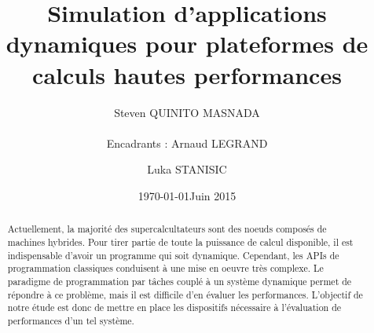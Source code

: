 \documentclass[smallextended]{svjour3}
\date{\today}
\title{}
\begin{document}
\newcommand{\AL}[2][inline]{\todo[color=green!50,#1]{\sf \textbf{AL:} #2}\xspace}
\newcommand{\LS}[2][inline]{\todo[color=green!50,#1]{\sf \textbf{LS:} #2}\xspace}

\let\oldcite=\cite
\renewcommand\cite[2][]{~\ifthenelse{\equal{#1}{}}{\oldcite{#2}}{\oldcite[#1]{#2}}\xspace}
\let\oldref=\ref
\def\ref#1{~\oldref{#1}\xspace}
\def\ie{i.e.,\xspace}
\def\eg{e.g.,\xspace}
\def\qrmspu{\texttt{QRM\_StarPU}\xspace}
\sloppy

\title{Simulation d'applications dynamiques pour plateformes de
calculs hautes performances%
}


\author{Steven QUINITO MASNADA  \\ \\
        Encadrants : Arnaud LEGRAND \and Luka STANISIC  %
}


\institute{%
}

\date{Juin 2015}

\maketitle


\begin{abstract}
Actuellement, la majorité des supercalcultateurs sont des noeuds
composés de machines hybrides. Pour tirer partie de toute la
puissance de calcul disponible, il est indispensable d'avoir un
programme qui soit dynamique. Cependant, les APIs de programmation
classiques conduisent à une mise en oeuvre très complexe.
Le paradigme de programmation par tâches couplé à un système
dynamique permet de répondre à ce problème, mais il est difficile
d'en évaluer les performances. L'objectif de notre étude est donc de
mettre en place les dispositifs nécessaire à l'évaluation de
performances d'un tel système. 
\newpage
\end{abstract}
\end{document}
